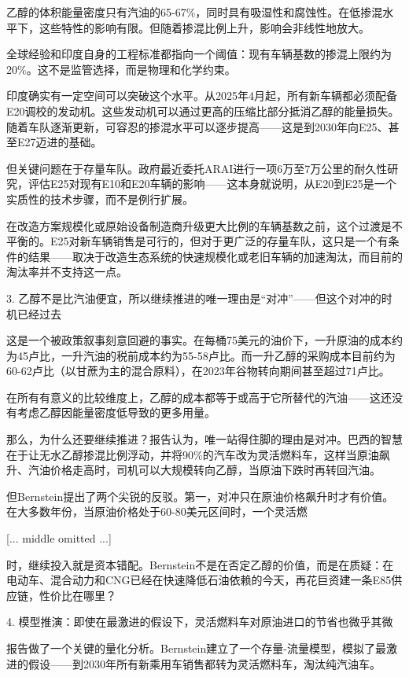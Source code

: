\documentclass[11pt]{ctexart}
\begin{document}
乙醇的体积能量密度只有汽油的65-67\%，同时具有吸湿性和腐蚀性。在低掺混水平下，这些特性的影响有限。但随着掺混比例上升，影响会非线性地放大。

全球经验和印度自身的工程标准都指向一个阈值：现有车辆基数的掺混上限约为20\%。这不是监管选择，而是物理和化学约束。

印度确实有一定空间可以突破这个水平。从2025年4月起，所有新车辆都必须配备E20调校的发动机。这些发动机可以通过更高的压缩比部分抵消乙醇的能量损失。随着车队逐渐更新，可容忍的掺混水平可以逐步提高——这是到2030年向E25、甚至E27迈进的基础。

但关键问题在于存量车队。政府最近委托ARAI进行一项6万至7万公里的耐久性研究，评估E25对现有E10和E20车辆的影响——这本身就说明，从E20到E25是一个实质性的技术步骤，而不是例行扩展。

在改造方案规模化或原始设备制造商升级更大比例的车辆基数之前，这个过渡是不平衡的。E25对新车辆销售是可行的，但对于更广泛的存量车队，这只是一个有条件的结果——取决于改造生态系统的快速规模化或老旧车辆的加速淘汰，而目前的淘汰率并不支持这一点。

3. 乙醇不是比汽油便宜，所以继续推进的唯一理由是“对冲”——但这个对冲的时机已经过去

这是一个被政策叙事刻意回避的事实。在每桶75美元的油价下，一升原油的成本约为45卢比，一升汽油的税前成本约为55-58卢比。而一升乙醇的采购成本目前约为60-62卢比（以甘蔗为主的混合原料），在2023年谷物转向期间甚至超过71卢比。

在所有有意义的比较维度上，乙醇的成本都等于或高于它所替代的汽油——这还没有考虑乙醇因能量密度低导致的更多用量。

那么，为什么还要继续推进？报告认为，唯一站得住脚的理由是对冲。巴西的智慧在于让无水乙醇掺混比例浮动，并将90\%的汽车改为灵活燃料车，这样当原油飙升、汽油价格走高时，司机可以大规模转向乙醇，当原油下跌时再转回汽油。

但Bernstein提出了两个尖锐的反驳。第一，对冲只在原油价格飙升时才有价值。在大多数年份，当原油价格处于60-80美元区间时，一个灵活燃

[... middle omitted ...]

时，继续投入就是资本错配。Bernstein不是在否定乙醇的价值，而是在质疑：在电动车、混合动力和CNG已经在快速降低石油依赖的今天，再花巨资建一条E85供应链，性价比在哪里？

4. 模型推演：即使在最激进的假设下，灵活燃料车对原油进口的节省也微乎其微

报告做了一个关键的量化分析。Bernstein建立了一个存量-流量模型，模拟了最激进的假设——到2030年所有新乘用车销售都转为灵活燃料车，淘汰纯汽油车。
\end{document}
